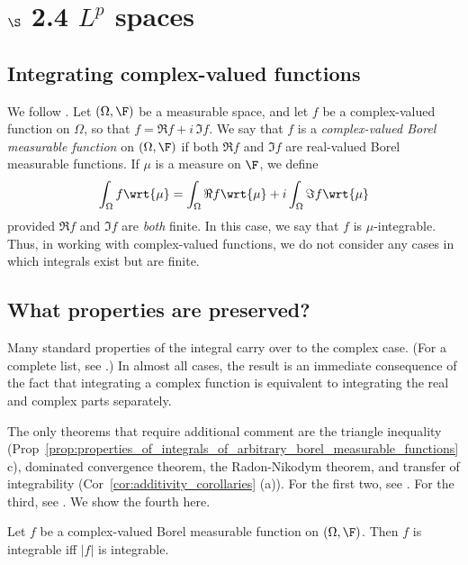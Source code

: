 \documentclass{article} %
\newcommand{\dmu}{\wrt{\mu}}
\begin{document}
\section{$\S$ 2.4 $L^p$ spaces}

\subsection{Integrating complex-valued functions}

We follow \cite[pp.~83]{ash2000probability}. Let $(\Omega, \F)$ be a measurable space, and let $f$ be a complex-valued function on $\Omega$, so that $f = \Re f + i \, \Im f$. We say that $f$ is a \textit{complex-valued Borel measurable function} on $(\Omega, \F)$ if both $\Re f$ and $\Im f$ are real-valued Borel measurable functions.  If $\mu$ is a measure on $\F$, we define
\begin{align}
\int_\Omega f \dmu = \int_\Omega \Re f \dmu + i \int_\Omega \Im f \dmu 
\label{eqn:def_of_integral_of_complex_functions}	
\end{align}
provided $\Re f$ and $\Im f$ are \textit{both} finite.   In this case, we say that $f$ is $\mu$-integrable.  Thus, in working with complex-valued functions, we do not consider any cases in which integrals exist but are finite. 

\subsection{What properties are preserved?}

Many standard properties of the integral carry over to the complex case.   (For a complete list, see \cite[pp.~84]{ash2000probability}.)  In almost all cases, the result is an immediate consequence of the fact that integrating a complex function is equivalent to integrating the real and complex parts separately. 

The only theorems that require additional comment are the triangle inequality (Prop~\ref{prop:properties_of_integrals_of_arbitrary_borel_measurable_functions} c), dominated convergence theorem, the  Radon-Nikodym theorem, and transfer of integrability (Cor~\ref{cor:additivity_corollaries} (a)).  For the first two, see \cite[pp.~84]{ash2000probability}. For the third, see \cite[Problem 10, pp.~95]{ash2000probability}. We show the fourth here.   

\begin{proposition}
Let $f$ be a complex-valued Borel measurable function on $(\Omega, \F)$.  Then $f$ is integrable iff $|f|$ is integrable. 	
\end{proposition}
\end{document}
